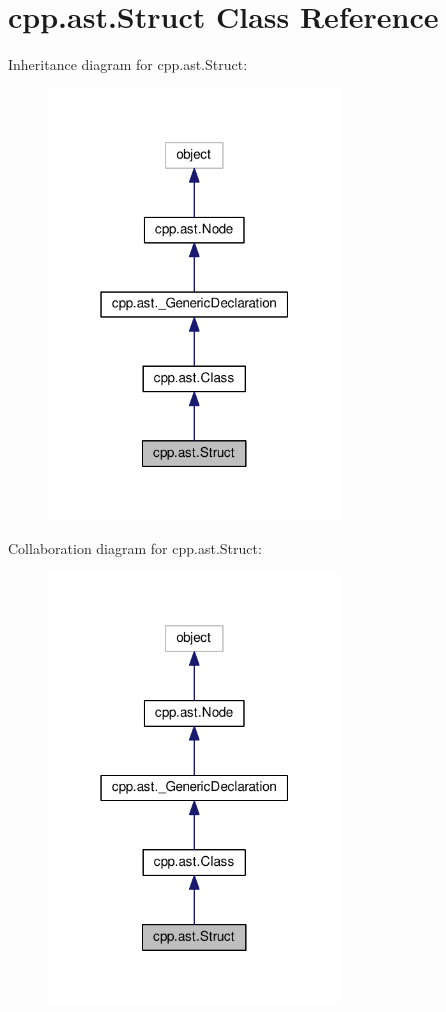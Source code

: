 \hypertarget{classcpp_1_1ast_1_1Struct}{}\section{cpp.\+ast.\+Struct Class Reference}
\label{classcpp_1_1ast_1_1Struct}


Inheritance diagram for cpp.\+ast.\+Struct\+:\nopagebreak
\begin{figure}[H]
\begin{center}
\leavevmode
\includegraphics[width=220pt]{classcpp_1_1ast_1_1Struct__inherit__graph}
\end{center}
\end{figure}


Collaboration diagram for cpp.\+ast.\+Struct\+:\nopagebreak
\begin{figure}[H]
\begin{center}
\leavevmode
\includegraphics[width=220pt]{classcpp_1_1ast_1_1Struct__coll__graph}
\end{center}
\end{figure}
